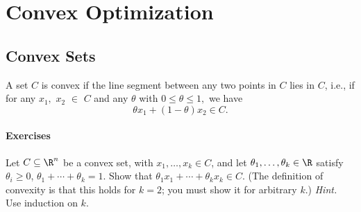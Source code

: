 \documentclass[12pt]{book}
\begin{document}
\chapter{Convex Optimization}


\section{Convex Sets}


\begin{definition}
    A set $C$ is convex if the line segment between any two points in $C$ lies in $C$, i.e., 
    if for any $x_1,$ $x_2$ $\in$ $C$ and any $\theta$ with $ 0 \le \theta \le 1,$ we have
    \[
        \theta x_1 + (1 - \theta) x_2 \in C.
    \]
\end{definition}


\subsubsection*{Exercises}


\begin{exercise}
    Let $C \subseteq \R^n$ be a convex set, with $x_1, \ldots, x_k \in C$, and let $\theta_1, \ldots, \theta_k \in \R$ satisfy $\theta_i \geq 0$, $\theta_1 + \cdots + \theta_k = 1$. Show that $\theta_1 x_1 + \cdots + \theta_k x_k \in C$. (The definition of convexity is that this holds for $k = 2$; you must show it for arbitrary $k$.) \textit{Hint.} Use induction on $k$.
\end{exercise}
\end{document}
